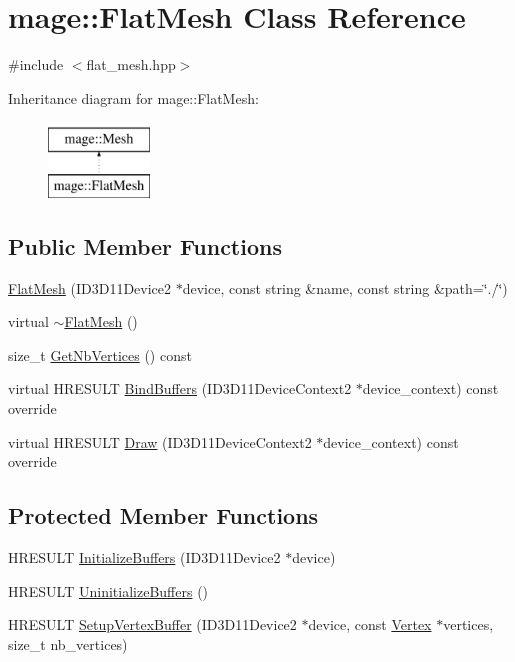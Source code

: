 \hypertarget{classmage_1_1_flat_mesh}{}\section{mage\+:\+:Flat\+Mesh Class Reference}
\label{classmage_1_1_flat_mesh}


{\ttfamily \#include $<$flat\+\_\+mesh.\+hpp$>$}

Inheritance diagram for mage\+:\+:Flat\+Mesh\+:\begin{figure}[H]
\begin{center}
\leavevmode
\includegraphics[height=2.000000cm]{classmage_1_1_flat_mesh}
\end{center}
\end{figure}
\subsection*{Public Member Functions}
\begin{DoxyCompactItemize}
\item 
\hyperlink{classmage_1_1_flat_mesh_a586098a2dee9ff270b0c147c28adda88}{Flat\+Mesh} (I\+D3\+D11\+Device2 $\ast$device, const string \&name, const string \&path=\char`\"{}./\char`\"{})
\item 
virtual \hyperlink{classmage_1_1_flat_mesh_a45956524d105918eea093c8faee3f584}{$\sim$\+Flat\+Mesh} ()
\item 
size\+\_\+t \hyperlink{classmage_1_1_flat_mesh_a88f69dd4fa4a1d09db67b6cc32e909ba}{Get\+Nb\+Vertices} () const
\item 
virtual H\+R\+E\+S\+U\+LT \hyperlink{classmage_1_1_flat_mesh_ab1906ae929a514a7b9b348d6a97fc2d4}{Bind\+Buffers} (I\+D3\+D11\+Device\+Context2 $\ast$device\+\_\+context) const override
\item 
virtual H\+R\+E\+S\+U\+LT \hyperlink{classmage_1_1_flat_mesh_abf73ceb1c98d4bd6925be6e6e087723b}{Draw} (I\+D3\+D11\+Device\+Context2 $\ast$device\+\_\+context) const override
\end{DoxyCompactItemize}
\subsection*{Protected Member Functions}
\begin{DoxyCompactItemize}
\item 
H\+R\+E\+S\+U\+LT \hyperlink{classmage_1_1_flat_mesh_a494f660eae4773c91c57663cd6410c4a}{Initialize\+Buffers} (I\+D3\+D11\+Device2 $\ast$device)
\item 
H\+R\+E\+S\+U\+LT \hyperlink{classmage_1_1_flat_mesh_ad355db238528f60d6600bc55a923f0bb}{Uninitialize\+Buffers} ()
\item 
H\+R\+E\+S\+U\+LT \hyperlink{classmage_1_1_flat_mesh_a99e9b24fee648ca2de48c794aa3fda19}{Setup\+Vertex\+Buffer} (I\+D3\+D11\+Device2 $\ast$device, const \hyperlink{structmage_1_1_vertex}{Vertex} $\ast$vertices, size\+\_\+t nb\+\_\+vertices)
\end{DoxyCompactItemize}
